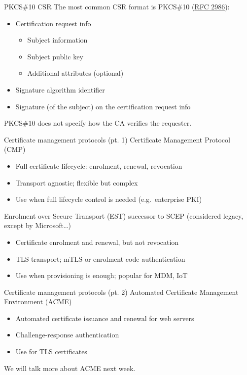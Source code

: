\begin{frame}{PKCS\#10 CSR}
  The most common CSR format is PKCS\#10 (\href{https://datatracker.ietf.org/doc/html/rfc2986}{RFC 2986}):
  \begin{itemize}[<+(1)->]
    \item Certification request info
    \begin{itemize}
      \item Subject information
      \item Subject public key
      \item Additional attributes (optional)
    \end{itemize}
    \item Signature algorithm identifier
    \item Signature (of the subject) on the certification request info
  \end{itemize}

  \vspace*{1em}

  \pause
  PKCS\#10 does not specify how the CA verifies the requester.
\end{frame}

\begin{frame}{Certificate management protocols (pt. 1)}
  Certificate Management Protocol (CMP)
  \begin{itemize}[<+(1)->]
    \item Full certificate lifecycle: enrolment, renewal, revocation
    \item Transport agnostic; flexible but complex
    \item Use when full lifecycle control is needed (e.g.\ enterprise PKI)
  \end{itemize}

  \vspace{1em}

  \pause
  Enrolment over Secure Transport (EST) {\scriptsize successor to SCEP (considered legacy, except by Microsoft\dots)}
  \begin{itemize}[<+(1)->]
    \item Certificate enrolment and renewal, but not revocation
    \item TLS transport; mTLS or enrolment code authentication
    \item Use when provisioning is enough; popular for MDM, IoT
  \end{itemize}
\end{frame}

\begin{frame}{Certificate management protocols (pt. 2)}
  Automated Certificate Management Environment (ACME)
  \begin{itemize}[<+(1)->]
    \item Automated certificate issuance and renewal for web servers
    \item Challenge-response authentication
    \item Use for TLS certificates
  \end{itemize}

  \pause
  We will talk more about ACME next week.
\end{frame}

